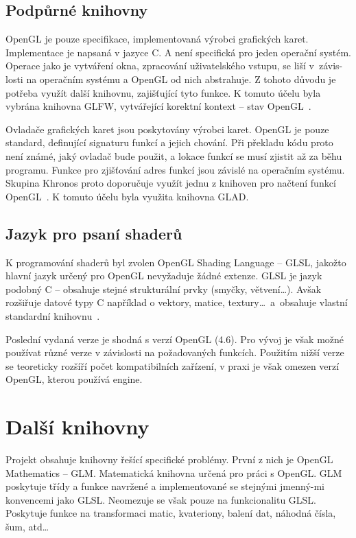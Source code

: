 \documentclass[thesis=M,czech]{FITthesis}[2019/12/23]
\begin{document}
\subsection{Podpůrné knihovny}
OpenGL je pouze specifikace, implementovaná výrobci grafických karet. Implementace je napsaná v jazyce C. A není specifická pro jeden operační systém. Operace jako je vytváření okna, zpracování uživatelského vstupu, se liší v~závis-losti na operačním systému a OpenGL od nich abstrahuje. Z tohoto důvodu je potřeba využít další knihovnu, zajišťující tyto funkce. K tomuto účelu byla vybrána knihovna GLFW, vytvářející korektní kontext -- stav OpenGL~\cite{lopgl_window}.

Ovladače grafických karet jsou poskytovány výrobci karet. OpenGL je pouze standard, definující signaturu funkcí a jejich chování. Při překladu kódu proto není známé, jaký ovladač bude použit, a lokace funkcí se musí zjistit až za běhu programu. Funkce pro zjišťování adres funkcí jsou závislé na operačním systému. Skupina Khronos proto doporučuje využít jednu z knihoven pro načtení funkcí OpenGL~\cite{kronos_load_lib}. K tomuto účelu byla využita knihovna GLAD.

\subsection{Jazyk pro psaní shaderů}
K programování shaderů byl zvolen OpenGL Shading Language -- GLSL, jakožto hlavní jazyk určený pro OpenGL nevyžaduje žádné extenze. GLSL je jazyk podobný C – obsahuje stejné strukturální prvky (smyčky, větvení\dots). Avšak rozšiřuje datové typy C například o vektory, matice, textury\dots ~a~obsahuje vlastní standardní knihovnu~\cite{kronos_glsl}.

Poslední vydaná verze je shodná s verzí OpenGL (4.6). Pro vývoj je však možné používat různé verze v závislosti na požadovaných funkcích. Použitím nižší verze se teoreticky rozšíří počet kompatibilních zařízení, v praxi je však omezen verzí OpenGL, kterou používá engine.

\section{Další knihovny}

Projekt obsahuje knihovny řešící specifické problémy. První z nich je OpenGL Mathematics -- GLM. Matematická knihovna určená pro práci s OpenGL. GLM poskytuje třídy a funkce navržené a implementované se stejnými jmenný-mi konvencemi jako GLSL. Neomezuje se však pouze na funkcionalitu GLSL. Poskytuje funkce na transformaci matic, kvateriony, balení dat, náhodná čísla, šum, atd\dots~\cite{glm_main}
\end{document}
